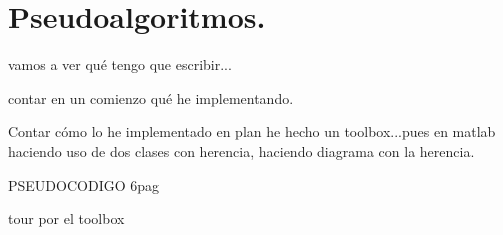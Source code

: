 
\section{Pseudoalgoritmos.}
vamos a ver qué tengo que escribir...
 
 contar en un comienzo qué he implementando.
 
 Contar cómo lo he implementado en plan he hecho un toolbox...pues en matlab haciendo uso de dos clases con herencia, haciendo diagrama con la herencia. 
 
 PSEUDOCODIGO 6pag
 
 tour por el toolbox